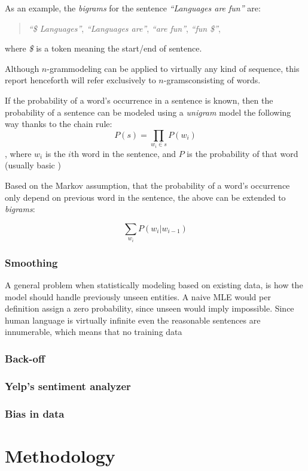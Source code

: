 \documentclass[a4paper,11pt]{kth-mag}
\newcommand{\ngram}{$n$-gram\ignorespaces}
\newcommand{\ngrams}{$n$-grams\ignorespaces}
\begin{document}
As an example, the \emph{bigrams} for the sentence \emph{``Languages are fun''} are:
\begin{quote}
  \vspace*{0.1cm}
  \centering
\emph{``\$ Languages''}, \emph{``Languages are''}, \emph{``are fun''}, \emph{``fun \$''},
\end{quote}
where \emph{\$} is a token meaning the start/end of sentence.

Although \ngram modeling can be applied to virtually any kind of sequence, this report henceforth will refer exclusively to \ngrams consisting of words.

If the probability of a word's occurrence in a sentence is known, then the probability of a sentence can be modeled using a \emph{unigram} model the following way thanks to the chain rule:
$$P(s) = \prod_{w_i \in s}P(w_i)$$, where $w_i$ is the $i$th word in the sentence, and $P$ is the probability of that word (usually basic )

Based on the Markov assumption, that the probability of a word's occurrence only depend on previous word in the sentence, the above can be extended to \emph{bigrams}:

$$\sum_{w_i}P(w_i|w_{i-1})$$

\subsection{Smoothing}
A general problem when statistically modeling based on existing data, is how the model should handle previously unseen entities. A naive \gls{MLE} would per definition assign a zero probability, since unseen would imply impossible. Since human language is virtually infinite even the reasonable sentences are innumerable, which means that no training data


\subsection{Back-off}

\subsection{Yelp's sentiment analyzer}

\subsection{Bias in data}
\label{subsec:bias}

\chapter{Methodology}
\end{document}
